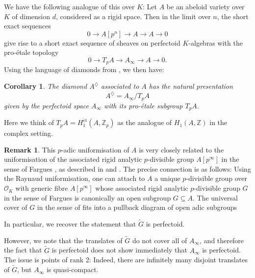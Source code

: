 \documentclass[10pt,oneside]{amsart}
\newtheorem{corollary}[theorem]{Corollary}
\theoremstyle{definition}
\newtheorem{remark}[theorem]{Remark}
\newcommand{\et}{\operatorname{\acute{e}t}}
\newcommand{\Z}{\mathbb{Z}}
\begin{document}
	We have the following analogue of this over $K$: Let $A$ be an abeloid variety over $K$ of dimension $d$, considered as a rigid space. Then in the limit over $n$, the short exact sequences
	\[ 0\to A[p^n]\to A\to A\to 0\]
	give rise to a short exact sequence of sheaves on perfectoid $K$-algebras with the pro-\'etale topology
	\[0\to T_pA \to A_\infty \to A\to 0.\]
	Using the language of diamonds from \cite[\S11]{etale_cohomology_of_diamonds}, we then have:
	\begin{corollary}
		The diamond $A^{\diamondsuit}$ associated to $A$ has the natural presentation
		\[A^{\diamondsuit} = A_\infty/T_pA \]
		given by the perfectoid space $A_\infty$ with its pro-\'etale subgroup $T_pA$.
	\end{corollary}
	Here we think of $T_pA=H^{\et}_1(A,\Z_p)$ as the analogue of $H_1(A,\Z)$ in the complex setting.
\begin{remark}
	This $p$-adic uniformisation of $A$ is very closely related to the uniformisation of the associated rigid analytic $p$-divisible group $A[p^\infty]$ in the sense of Fargues \cite{Fargues-groupes-analytiques}, as described in \cite[\S4.4]{survey} and \cite[Proposition 3.1.3]{SW}. The precise connection is as follows: Using the Raynaud uniformisation, one can attach to $A$ a unique $p$-divisible group over $\mathcal O_K$ with generic fibre $A[p^\infty]$ whose associated rigid analytic $p$-divisible group $G$ in the sense of Fargues is canonically an open subgroup $G\subseteq A$. The universal cover of $G$ in the sense of \cite[\S 3.1]{SW} fits into a pullback diagram of open adic subgroups
	\begin{center}
	\end{center}
	In particular, we recover the statement that $\widetilde{G}$ is perfectoid. 
	
	However, we note that the translates of $\widetilde{G}$ do not cover all of $A_\infty$, and therefore the fact that $\widetilde{G}$ is perfectoid does not show immediately that $A_\infty$ is perfectoid.  The issue is points of rank 2: Indeed, there are infinitely many disjoint translates of $\widetilde G$, but $A_\infty$ is quasi-compact.
\end{remark}
\end{document}
